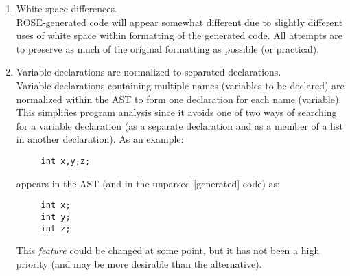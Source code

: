 \begin{enumerate}
     \item White space differences. \\
     ROSE-generated code will appear somewhat different due to slightly different
     uses of white space within formatting of the generated code.  All attempts
     are to preserve as much of the original formatting as possible (or practical).


     \item Variable declarations are normalized to separated declarations. \\
     Variable declarations containing multiple names (variables to be declared) are
     normalized within the AST to form one declaration for each name (variable).  This
     simplifies program analysis since it avoids one of two ways of searching for a
     variable declaration (as a separate declaration and as a member of a list in another
     declaration). As an example:
{\indent
{\mySmallFontSize

\begin{verbatim}
     int x,y,z;
\end{verbatim}
}}
     appears in the AST (and in the unparsed [generated] code) as:
{\indent
{\mySmallFontSize

\begin{verbatim}
     int x;
     int y;
     int z;
\end{verbatim}
}}
     This {\em feature} could be changed at some point, but it has not been a
     high priority (and may be more desirable than the alternative).


\end{enumerate}
